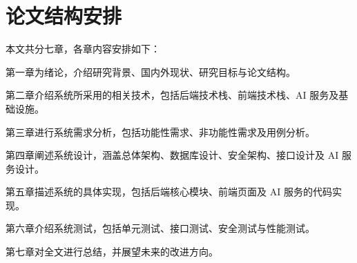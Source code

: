 \section{论文结构安排}

本文共分七章，各章内容安排如下：

第一章为绪论，介绍研究背景、国内外现状、研究目标与论文结构。

第二章介绍系统所采用的相关技术，包括后端技术栈、前端技术栈、AI 服务及基础设施。

第三章进行系统需求分析，包括功能性需求、非功能性需求及用例分析。

第四章阐述系统设计，涵盖总体架构、数据库设计、安全架构、接口设计及 AI 服务设计。

第五章描述系统的具体实现，包括后端核心模块、前端页面及 AI 服务的代码实现。

第六章介绍系统测试，包括单元测试、接口测试、安全测试与性能测试。

第七章对全文进行总结，并展望未来的改进方向。




